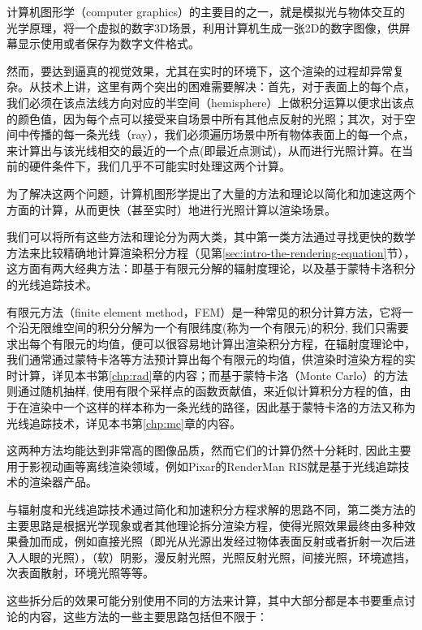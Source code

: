 计算机图形学（computer graphics）的主要目的之一，就是模拟光与物体交互的光学原理，将一个虚拟的数字3D场景，利用计算机生成一张2D的数字图像，供屏幕显示使用或者保存为数字文件格式。

然而，要达到逼真的视觉效果，尤其在实时的环境下，这个渲染的过程却异常复杂。从技术上讲，这里有两个突出的困难需要解决：首先，对于表面上的每个点，我们必须在该点法线方向对应的半空间（hemisphere）上做积分运算以便求出该点的颜色值，因为每个点可以接受来自场景中所有其他点反射的光照；其次，对于空间中传播的每一条光线（ray），我们必须遍历场景中所有物体表面上的每一个点，来计算出与该光线相交的最近的一个点(即最近点测试)，从而进行光照计算。在当前的硬件条件下，我们几乎不可能实时处理这两个计算。

为了解决这两个问题，计算机图形学提出了大量的方法和理论以简化和加速这两个方面的计算，从而更快（甚至实时）地进行光照计算以渲染场景。

我们可以将所有这些方法和理论分为两大类，其中第一类方法通过寻找更快的数学方法来比较精确地计算渲染积分方程（见第\ref{sec:intro-the-rendering-equation}节），这方面有两大经典方法：即基于有限元分解的辐射度理论，以及基于蒙特卡洛积分的光线追踪技术。

有限元方法（finite element method，FEM）是一种常见的积分计算方法，它将一个沿无限维空间的积分分解为一个有限纬度(称为一个有限元)的积分, 我们只需要求出每个有限元的均值，便可以很容易地计算出渲染积分方程，在辐射度理论中，我们通常通过蒙特卡洛等方法预计算出每个有限元的均值，供渲染时渲染方程的实时计算，详见本书第\ref{chp:rad}章的内容；而基于蒙特卡洛（Monte Carlo）的方法则通过随机抽样, 使用有限个采样点的函数贡献值，来近似计算积分方程的值，由于在渲染中一个这样的样本称为一条光线的路径，因此基于蒙特卡洛的方法又称为光线追踪技术，详见本书第\ref{chp:mc}章的内容。

这两种方法均能达到非常高的图像品质，然而它们的计算仍然十分耗时, 因此主要用于影视动画等离线渲染领域，例如Pixar的RenderMan RIS就是基于光线追踪技术的渲染器产品。

与辐射度和光线追踪技术通过简化和加速积分方程求解的思路不同，第二类方法的主要思路是根据光学现象或者其他理论拆分渲染方程，使得光照效果最终由多种效果叠加而成，例如直接光照（即光从光源出发经过物体表面反射或者折射一次后进入人眼的光照），（软）阴影，漫反射光照，光照反射光照，间接光照，环境遮挡，次表面散射，环境光照等等。

这些拆分后的效果可能分别使用不同的方法来计算，其中大部分都是本书要重点讨论的内容，这些方法的一些主要思路包括但不限于：

